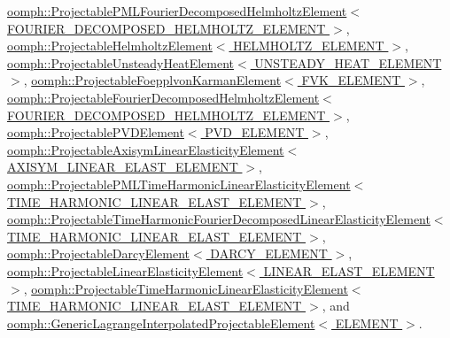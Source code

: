 \hyperlink{classoomph_1_1ProjectablePMLFourierDecomposedHelmholtzElement_a53156274a681c286bbb20920e925b55e}{oomph\+::\+Projectable\+P\+M\+L\+Fourier\+Decomposed\+Helmholtz\+Element$<$ F\+O\+U\+R\+I\+E\+R\+\_\+\+D\+E\+C\+O\+M\+P\+O\+S\+E\+D\+\_\+\+H\+E\+L\+M\+H\+O\+L\+T\+Z\+\_\+\+E\+L\+E\+M\+E\+N\+T $>$}, \hyperlink{classoomph_1_1ProjectableHelmholtzElement_a6635aa1b760348ac92784c4e7bb6db38}{oomph\+::\+Projectable\+Helmholtz\+Element$<$ H\+E\+L\+M\+H\+O\+L\+T\+Z\+\_\+\+E\+L\+E\+M\+E\+N\+T $>$}, \hyperlink{classoomph_1_1ProjectableUnsteadyHeatElement_ae4b0cb13a1849f7e950252164884eeba}{oomph\+::\+Projectable\+Unsteady\+Heat\+Element$<$ U\+N\+S\+T\+E\+A\+D\+Y\+\_\+\+H\+E\+A\+T\+\_\+\+E\+L\+E\+M\+E\+N\+T $>$}, \hyperlink{classoomph_1_1ProjectableFoepplvonKarmanElement_a762989fdeb0489dec57bb386ea6ebf58}{oomph\+::\+Projectable\+Foepplvon\+Karman\+Element$<$ F\+V\+K\+\_\+\+E\+L\+E\+M\+E\+N\+T $>$}, \hyperlink{classoomph_1_1ProjectableFourierDecomposedHelmholtzElement_a163cc475f2675b5cc5e596ae9326df1b}{oomph\+::\+Projectable\+Fourier\+Decomposed\+Helmholtz\+Element$<$ F\+O\+U\+R\+I\+E\+R\+\_\+\+D\+E\+C\+O\+M\+P\+O\+S\+E\+D\+\_\+\+H\+E\+L\+M\+H\+O\+L\+T\+Z\+\_\+\+E\+L\+E\+M\+E\+N\+T $>$}, \hyperlink{classoomph_1_1ProjectablePVDElement_a4a193dadf4194ff1967c0e955b8b7666}{oomph\+::\+Projectable\+P\+V\+D\+Element$<$ P\+V\+D\+\_\+\+E\+L\+E\+M\+E\+N\+T $>$}, \hyperlink{classoomph_1_1ProjectableAxisymLinearElasticityElement_a125b64cda7cc665d987660bccedd3c39}{oomph\+::\+Projectable\+Axisym\+Linear\+Elasticity\+Element$<$ A\+X\+I\+S\+Y\+M\+\_\+\+L\+I\+N\+E\+A\+R\+\_\+\+E\+L\+A\+S\+T\+\_\+\+E\+L\+E\+M\+E\+N\+T $>$}, \hyperlink{classoomph_1_1ProjectablePMLTimeHarmonicLinearElasticityElement_a3b6f5752dac14debbbbe757d1a10ba97}{oomph\+::\+Projectable\+P\+M\+L\+Time\+Harmonic\+Linear\+Elasticity\+Element$<$ T\+I\+M\+E\+\_\+\+H\+A\+R\+M\+O\+N\+I\+C\+\_\+\+L\+I\+N\+E\+A\+R\+\_\+\+E\+L\+A\+S\+T\+\_\+\+E\+L\+E\+M\+E\+N\+T $>$}, \hyperlink{classoomph_1_1ProjectableTimeHarmonicFourierDecomposedLinearElasticityElement_a789c16121f259adb1a04f9f283a1e277}{oomph\+::\+Projectable\+Time\+Harmonic\+Fourier\+Decomposed\+Linear\+Elasticity\+Element$<$ T\+I\+M\+E\+\_\+\+H\+A\+R\+M\+O\+N\+I\+C\+\_\+\+L\+I\+N\+E\+A\+R\+\_\+\+E\+L\+A\+S\+T\+\_\+\+E\+L\+E\+M\+E\+N\+T $>$}, \hyperlink{classoomph_1_1ProjectableDarcyElement_a3911971a5babcc1bb85bd1dd46b30fc9}{oomph\+::\+Projectable\+Darcy\+Element$<$ D\+A\+R\+C\+Y\+\_\+\+E\+L\+E\+M\+E\+N\+T $>$}, \hyperlink{classoomph_1_1ProjectableLinearElasticityElement_a00c02d888df64225d0e0e3e132496094}{oomph\+::\+Projectable\+Linear\+Elasticity\+Element$<$ L\+I\+N\+E\+A\+R\+\_\+\+E\+L\+A\+S\+T\+\_\+\+E\+L\+E\+M\+E\+N\+T $>$}, \hyperlink{classoomph_1_1ProjectableTimeHarmonicLinearElasticityElement_ac65b20b221ae454e0b236612ebd3e30b}{oomph\+::\+Projectable\+Time\+Harmonic\+Linear\+Elasticity\+Element$<$ T\+I\+M\+E\+\_\+\+H\+A\+R\+M\+O\+N\+I\+C\+\_\+\+L\+I\+N\+E\+A\+R\+\_\+\+E\+L\+A\+S\+T\+\_\+\+E\+L\+E\+M\+E\+N\+T $>$}, and \hyperlink{classoomph_1_1GenericLagrangeInterpolatedProjectableElement_a788234ec49e0702b4af030d03a454adc}{oomph\+::\+Generic\+Lagrange\+Interpolated\+Projectable\+Element$<$ E\+L\+E\+M\+E\+N\+T $>$}.



